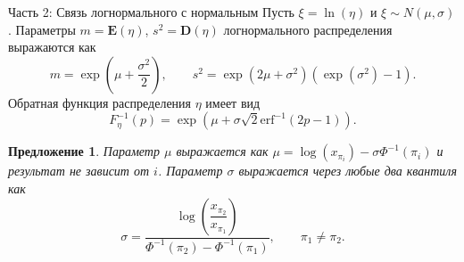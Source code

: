 \documentclass[ucs, notheorems, handout]{beamer}
\newtheorem{proposition2}[theorem]{Предложение}
\begin{document}
	\begin{frame}{Часть 2: Связь логнормального с нормальным}
		Пусть $\xi = \ln(\eta)$ и $\xi \sim N(\mu, \sigma)$. Параметры $m = \mathbf E(\eta)$, $s^{2} = \mathbf D(\eta)$ логнормального распределения выражаются как
		\[m = \exp\left( \mu + \dfrac{\sigma^{2}}{2}\right), \quad\quad s^{2} = \exp\left( 2\mu +\sigma^{2}\right)(\exp(\sigma^{2})-1).\]
		Обратная функция распределения $\eta$ имеет вид
		\begin{equation*}
			F_{\eta}^{-1}(p) = \exp(\mu+\sigma\sqrt{2}\mathrm{erf}^{-1}(2p-1)). \label{10}
		\end{equation*}
	\begin{proposition2}
		Параметр $\mu$ выражается как $\mu = \log(x_{\pi_{i}}) - \sigma\Phi ^{-1}(\pi_{i})$
		и результат не зависит от $i$.
		Параметр $\sigma$ выражается через любые два квантиля как
		\begin{equation*}
			\displaystyle{\sigma = \dfrac{\log\left(\dfrac{x_{\pi_{2}}}{x_{\pi_{1}}}\right)}{\Phi ^{-1}(\pi_{2}) - \Phi ^{-1}(\pi_{1})}}, \quad \quad \pi_{1}\neq \pi_{2}. \label{11}
		\end{equation*} 
	\end{proposition2}
		
	\end{frame}
	
\end{document}

